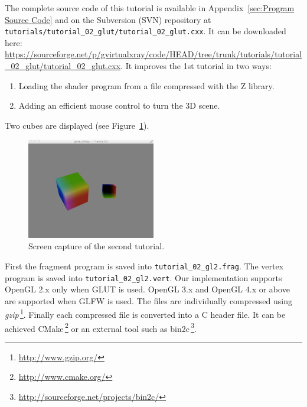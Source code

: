 \documentclass[11pt,oneside,a4paper,final]{article}
\begin{document}
The complete source code of this tutorial is available in 
Appendix~\ref{sec:Program Source Code} and on the Subversion (SVN) repository 
at 
\verb+tutorials/tutorial_02_glut/tutorial_02_glut.cxx+. 
It can be downloaded here: 
\url{
https://sourceforge.net/p/gvirtualxray/code/HEAD/tree/trunk/tutorials/tutorial_02_glut/tutorial_02_glut.cxx}.
It improves the 1st tutorial in two ways:
\begin{enumerate}
	\item Loading the shader program from a file compressed with the Z library.
	\item Adding an efficient mouse control to turn the 3D scene.
\end{enumerate}
Two cubes are displayed (see Figure~\ref{fig:scene}). 
\begin{figure}[bth]
 \centering
 \includegraphics[width=0.5\textwidth]{screenshot}
 \caption{\label{fig:scene} Screen capture of the second tutorial.}
\end{figure}
First the fragment program is saved into \verb+tutorial_02_gl2.frag+. 
The vertex program is saved into \verb+tutorial_02_gl2.vert+. 
Our implementation supports OpenGL 2.x only when GLUT is used. 
OpenGL 3.x and OpenGL 4.x or above are supported when GLFW is used. 
The files are individually compressed using \textit{gzip}\,\footnote{\url{http://www.gzip.org/}}. 
Finally each compressed file is converted into a C header file. 
It can be achieved CMake\,\footnote{\url{http://www.cmake.org/}} or an external tool such as bin2c\,\footnote{\url{http://sourceforge.net/projects/bin2c/}}. 
\end{document}
